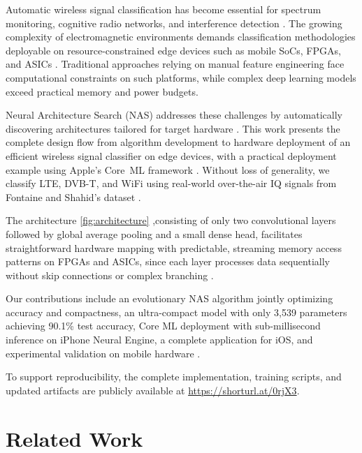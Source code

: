 \documentclass[conference]{IEEEtran}
\begin{document}
Automatic wireless signal classification has become essential for spectrum monitoring, cognitive radio networks, and interference detection \cite{oshea2017introduction}. The growing complexity of electromagnetic environments demands classification methodologies deployable on resource-constrained edge devices such as mobile SoCs, FPGAs, and ASICs \cite{gurbuz2022deep}. Traditional approaches relying on manual feature engineering face computational constraints on such platforms, while complex deep learning models exceed practical memory and power budgets.

Neural Architecture Search (NAS) addresses these challenges by automatically discovering architectures tailored for target hardware \cite{zoph2016neural, real2019regularized}. This work presents the complete design flow from algorithm development to hardware deployment of an efficient wireless signal classifier on edge devices, with a practical deployment example using Apple's Core~ML framework \cite{coreml_guide}. Without loss of generality, we classify LTE, DVB-T, and WiFi using real-world over-the-air IQ signals from Fontaine and Shahid's dataset \cite{fontaine2023dataset, fontaine2019low, fontaine2023github}.

The architecture \ref{fig:architecture} ,consisting of only two convolutional layers followed by global average pooling and a small dense head, facilitates straightforward hardware mapping with predictable, streaming memory access patterns on FPGAs and ASICs, since each layer processes data sequentially without skip connections or complex branching \cite{gurbuz2022deep}.

Our contributions include an evolutionary NAS algorithm jointly optimizing accuracy and compactness, an ultra-compact model with only 3,539 parameters achieving 90.1\% test accuracy, Core ML deployment with sub-millisecond inference on iPhone Neural Engine, a complete application for iOS, and experimental validation on mobile hardware \cite{fontaine2019low, liu2017wireless}.

To support reproducibility, the complete implementation, training scripts, and updated artifacts are publicly available at \url{https://shorturl.at/0rjX3}.

\section{Related Work}
\end{document}
